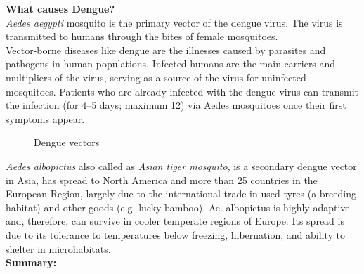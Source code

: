 \documentclass[11pt]{exam}
\begin{document}
\begin{questions}
\question
\label{3. Dengue cause }
\textbf{What causes Dengue?}\\
\textbf{}
\textit{Aedes aegypti} mosquito is the primary vector of the dengue virus. The virus is transmitted to humans through the bites of female mosquitoes. \\
Vector-borne diseases like dengue are the illnesses caused by parasites and pathogens in human populations. Infected humans are the main carriers and multipliers of the virus, serving as a source of the virus for uninfected mosquitoes. Patients who are already infected with the dengue virus can transmit the infection (for 4–5 days; maximum 12) via Aedes mosquitoes once their first symptoms appear. \\ 

\begin{figure}[H]
  \centering
  \hfill
  \caption{Dengue vectors}
  \label{Dengue vectors }
\end{figure} 

\textit{Aedes albopictus} also called as \textit{Asian tiger mosquito}, is a secondary dengue vector in Asia, has spread to North America and more than 25 countries in the European Region, largely due to the international trade in used tyres (a breeding habitat) and other goods (e.g. lucky bamboo). Ae. albopictus is highly adaptive and, therefore, can survive in cooler temperate regions of Europe. Its spread is due to its tolerance to temperatures below freezing, hibernation, and ability to shelter in microhabitats.\\

\textbf{Summary:} \\
\\ \\


\end{questions}
\end{document}
